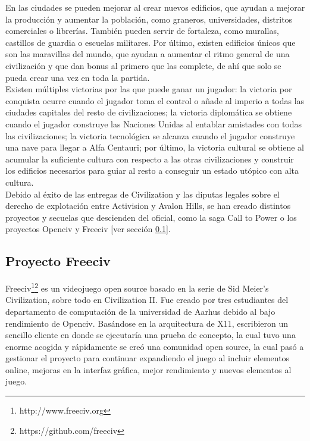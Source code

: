 En las ciudades se pueden mejorar al crear nuevos edificios, que ayudan a mejorar la producción y aumentar la población, como graneros, universidades, distritos comerciales o librerías. También pueden servir de fortaleza, como murallas, castillos de guardia o escuelas militares. Por último, existen edificios únicos que son las maravillas del mundo, que ayudan a aumentar el ritmo general de una civilización y que dan bonus al primero que las complete, de ahí que solo se pueda crear una vez en toda la partida. \\

Existen múltiples victorias por las que puede ganar un jugador: la victoria por conquista ocurre cuando el jugador toma el control o añade al imperio a todas las ciudades capitales del resto de civilizaciones; la victoria diplomática se obtiene cuando el jugador construye las Naciones Unidas al entablar amistades con todas las civilizaciones; la victoria tecnológica se alcanza cuando el jugador construye una nave para llegar a Alfa Centauri; por último, la victoria cultural se obtiene al acumular la suficiente cultura con respecto a las otras civilizaciones y construir los edificios necesarios para guiar al resto a conseguir un estado utópico con alta cultura. \\

Debido al éxito de las entregas de Civilization y las diputas legales sobre el derecho de explotación entre Activision y Avalon Hills, se han creado distintos proyectos y secuelas que descienden del oficial, como la saga Call to Power o los proyectos Openciv y Freeciv [ver sección \ref{subsec:freeciv}].

\subsection{Proyecto Freeciv}\label{subsec:freeciv}

Freeciv\footnote{http://www.freeciv.org}\footnote{https://github.com/freeciv} es un videojuego open source basado en la serie de Sid Meier's Civilization, sobre todo en Civilization II. Fue creado por tres estudiantes del departamento de computación de la universidad de Aarhus debido al bajo rendimiento de Openciv. Basándose en la arquitectura de X11, escribieron un sencillo cliente en donde se ejecutaría una prueba de concepto, la cual tuvo una enorme acogida y rápidamente se creó una comunidad open source, la cual pasó a gestionar el proyecto para continuar expandiendo el juego al incluir elementos online, mejoras en la interfaz gráfica, mejor rendimiento y nuevos elementos al juego.

